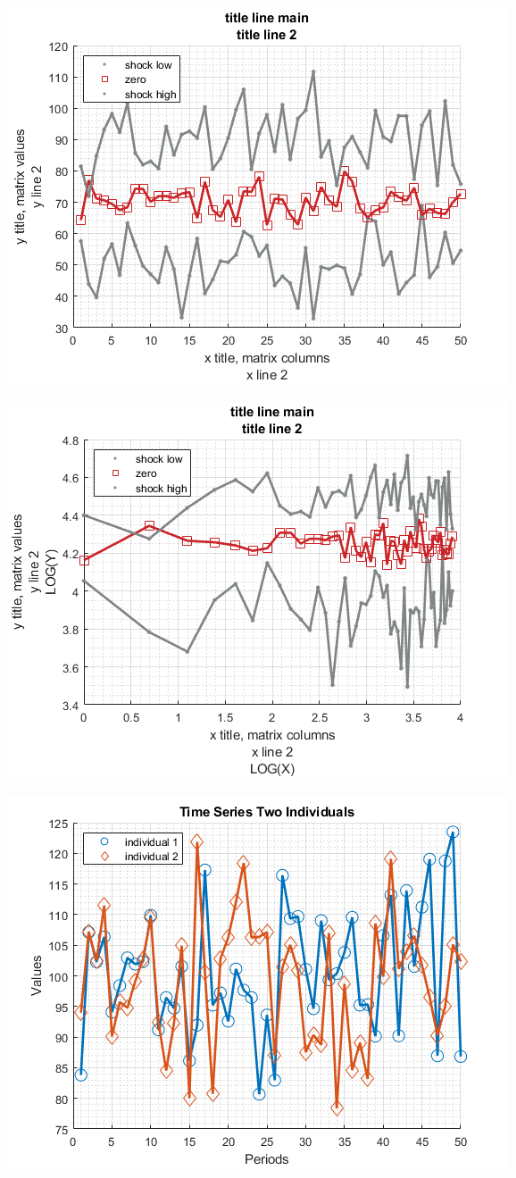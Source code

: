 \documentclass[
]{book}
\begin{document}
\includegraphics[width=5.20833in,height=\textheight]{img/fx_graph_grid_images/figure_2.png}

\includegraphics[width=5.20833in,height=\textheight]{img/fx_graph_grid_images/figure_3.png}

\includegraphics[width=5.20833in,height=\textheight]{img/fx_graph_grid_images/figure_4.png}
\end{document}
